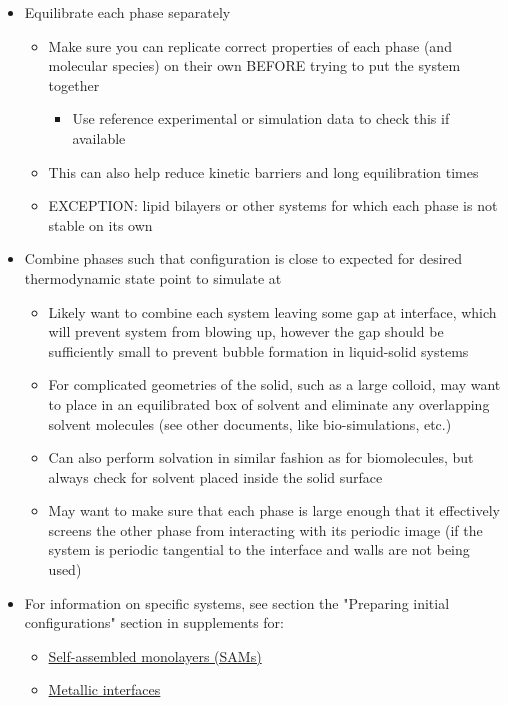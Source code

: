 \documentclass[9pt]{livecoms}
\begin{document}
\begin{itemize}
	\item Equilibrate each phase separately
	\begin{itemize}
		\item Make sure you can replicate correct properties of each phase (and molecular species) on their own BEFORE trying to put the system together
		\begin{itemize}		
			\item Use reference experimental or simulation data to check this if available
		\end{itemize}
		\item This can also help reduce kinetic barriers and long equilibration times
		\item EXCEPTION: lipid bilayers or other systems for which each phase is not stable on its own
	\end{itemize}
	\item Combine phases such that configuration is close to expected for desired thermodynamic state point to simulate at
	\begin{itemize}
		\item Likely want to combine each system leaving some gap at interface, which will prevent system from blowing up, however the gap should be sufficiently small to prevent bubble formation in liquid-solid systems
		\item For complicated geometries of the solid, such as a large colloid, may want to place in an equilibrated box of solvent and eliminate any overlapping solvent molecules (see other documents, like bio-simulations, etc.)
		\item Can also perform solvation in similar fashion as for biomolecules, but always check for solvent placed inside the solid surface
		\item May want to make sure that each phase is large enough that it effectively screens the other phase from interacting with its periodic image (if the system is periodic tangential to the interface and walls are not being used)
	\end{itemize}
	\item For information on specific systems, see section the "Preparing initial configurations" section in supplements for:
	\begin{itemize}
		\item \hyperref[subsec:SAMPrep]{Self-assembled monolayers (SAMs)}
		\item \hyperref[subsec:MetPrep]{Metallic interfaces}
	\end{itemize}
\end{itemize}
\end{document}
